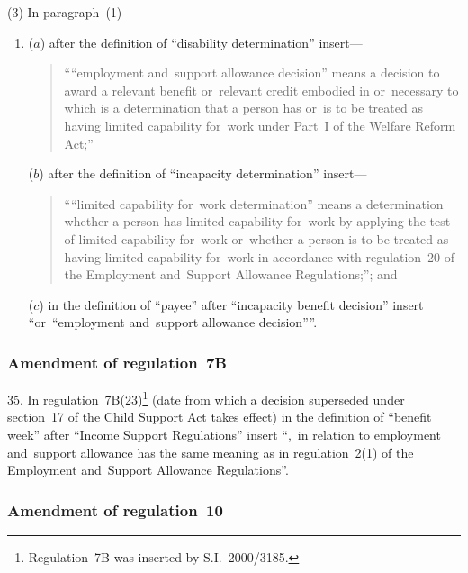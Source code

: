 \documentclass[12pt,a4paper]{article}
\begin{document}
(3) In paragraph~(1)—
\begin{enumerate}\item[]
($a$) after the definition of “disability determination” insert—
\begin{quotation}
““employment and~support allowance decision” means a decision to award a relevant benefit or~relevant credit embodied in or~necessary to which is a determination that a person has or~is to be treated as having limited capability for~work under Part~I of the Welfare Reform Act;”
\end{quotation}

($b$) after the definition of “incapacity determination” insert—
\begin{quotation}
““limited capability for~work determination” means a determination whether a person has limited capability for~work by applying the test of limited capability for~work or~whether a person is to be treated as having limited capability for~work in accordance with regulation~20 of the Employment and~Support Allowance Regulations;”; and
\end{quotation}

($c$) in the definition of “payee” after “incapacity benefit decision” insert “or~“employment and~support allowance decision””.
\end{enumerate}

\subsubsection[35. Amendment of regulation~7B]{Amendment of regulation~7B}

35.  In regulation~7B(23)\footnote{Regulation~7B was inserted by S.I.~2000/3185.} (date from which a decision superseded under section~17 of the Child Support Act takes effect) in the definition of “benefit week” after “Income Support Regulations” insert “,~in relation to employment and~support allowance has the same meaning as in regulation~2(1) of the Employment and~Support Allowance Regulations”.

\subsubsection[36. Amendment of regulation~10]{Amendment of regulation~10}
\end{document}
